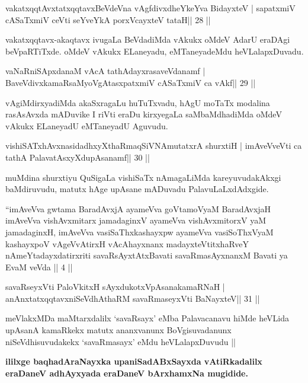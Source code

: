 \begin{shl}
vakatxqqtAvxtatxqqtavxBeVdeVna vAgfdivxdheYkeYva BidayxteV |
sapatxmiV cASaTxmiV ceVti seYveYkA porxVcayxteV tataH\hfill || 28 ||
\end{shl}

\begin{artha}
vakatxqqtavx-akaqtavx ivugaLa BeVdadiMda vAkukx oMdeV AdarU eraDAgi beVpaRTiTxde. oMdeV vAkukx ELaneyadu, eMTaneyadeMdu heVLalapxDuvadu.
\end{artha}



\begin{shl}
vaNaRniSApxdanaM vAcA tathA\s\s dayxrasaveVdanamf |
BaveVdivxkamaRsaMyoVgAtasxpatxmiV cASaTxmiV ca vAkf\hfill || 29 ||
\end{shl}

\begin{artha}
vAgiMdirxyadiMda akaSxragaLu huTuTxvadu, hAgU moTaTx modalina rasAsAvxda mADuvike I riVti eraDu kirxyegaLa saMbaMdhadiMda oMdeV vAkukx ELaneyadU eMTaneyadU Aguvudu.
\end{artha}


\begin{shl}
vishiSATxhAvxnasidadhxyXthaRmaqSiVNAmutatxrA shurxtiH |
imAveVveVti ca tathA PalavatAsxyXdupAsanamf\hfill || 30 ||
\end{shl}

\begin{artha}
muMdina shurxtiyu QuSigaLa vishiSaTx nAmagaLiMda kareyuvudakAkxgi
baMdiruvudu, matutx hAge upAsane mADuvadu PalavuLaLxdAdxgide.
\end{artha}


{}

\begin{kandikeshl}
``imAveVva gwtama BaradAvxjA ayameVva goVtamoV\s yaM BaradAvxjaH
  imAveVva vishAvxmitarx jamadaginxV ayameVva vishAvxmitorxV\s
  yaM jamadaginxH, imAveVva vasiSaThxkashayxpw ayameVva vasiSoThxV\s yaM
  kashayxpoV vAgeVvAtirxH vAcAhayxnanx madayxteV\s titxhaRveY
  nAmeYtadayxdatirxriti savaRsAyxtAtxBavati savaRmasAyxnanxM Bavati
  ya EvaM veVda || 4 ||
\end{kandikeshl}

\begin{shl}
savaRseyxVti PaloVkitxH sAyxdukotxVpAsanakamaRNaH |
anAnxtatxqqtavxniSeVdhAthaRM savaRmaseyxVti BaNayxteV\hfill || 31 ||
\end{shl}

\begin{artha}
meVlakxMDa maMtarxdalilx `savaRsayx' eMba Palavacanavu hiMde heVLida
upAsanA kamaRkekx matutx ananxvanunx BoVgisuvadanunx niSeVdhisuvudakekx
`savaRmasayx' eMdu heVLalapxDuvudu || 
\end{artha}

\begin{center}
{\textbf{ililxge baqhadAraNayxka upaniSadABxSayxda vAtiRkadalilx 
eraDaneV adhAyxyada eraDaneV bArxhamxNa mugidide.}}
\end{center}
